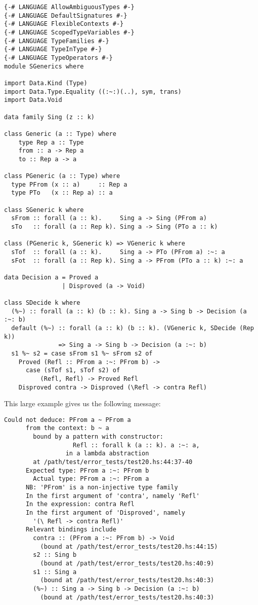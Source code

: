 \documentclass[a4paper]{article}
\begin{document}
\begin{lstlisting}[label={lst: T13.0}, numbers=none, caption={Example Program \cite{ex13}}]
{-# LANGUAGE AllowAmbiguousTypes #-}
{-# LANGUAGE DefaultSignatures #-}
{-# LANGUAGE FlexibleContexts #-}
{-# LANGUAGE ScopedTypeVariables #-}
{-# LANGUAGE TypeFamilies #-}
{-# LANGUAGE TypeInType #-}
{-# LANGUAGE TypeOperators #-}
module SGenerics where

import Data.Kind (Type)
import Data.Type.Equality ((:~:)(..), sym, trans)
import Data.Void

data family Sing (z :: k)

class Generic (a :: Type) where
    type Rep a :: Type
    from :: a -> Rep a
    to :: Rep a -> a

class PGeneric (a :: Type) where
  type PFrom (x :: a)     :: Rep a
  type PTo   (x :: Rep a) :: a

class SGeneric k where
  sFrom :: forall (a :: k).     Sing a -> Sing (PFrom a)
  sTo   :: forall (a :: Rep k). Sing a -> Sing (PTo a :: k)

class (PGeneric k, SGeneric k) => VGeneric k where
  sTof  :: forall (a :: k).     Sing a -> PTo (PFrom a) :~: a
  sFot  :: forall (a :: Rep k). Sing a -> PFrom (PTo a :: k) :~: a

data Decision a = Proved a
                | Disproved (a -> Void)

class SDecide k where
  (%~) :: forall (a :: k) (b :: k). Sing a -> Sing b -> Decision (a :~: b)
  default (%~) :: forall (a :: k) (b :: k). (VGeneric k, SDecide (Rep k))
               => Sing a -> Sing b -> Decision (a :~: b)
  s1 %~ s2 = case sFrom s1 %~ sFrom s2 of
    Proved (Refl :: PFrom a :~: PFrom b) ->
      case (sTof s1, sTof s2) of
          (Refl, Refl) -> Proved Refl
    Disproved contra -> Disproved (\Refl -> contra Refl)
\end{lstlisting}

This large example gives us the following message:

\begin{lstlisting}[label={lst: T13.0.2}, numbers=none, caption={Error}]
Could not deduce: PFrom a ~ PFrom a
      from the context: b ~ a
        bound by a pattern with constructor:
                   Refl :: forall k (a :: k). a :~: a,
                 in a lambda abstraction
        at /path/test/error_tests/test20.hs:44:37-40
      Expected type: PFrom a :~: PFrom b
        Actual type: PFrom a :~: PFrom a
      NB: 'PFrom' is a non-injective type family
      In the first argument of 'contra', namely 'Refl'
      In the expression: contra Refl
      In the first argument of 'Disproved', namely
        '(\ Refl -> contra Refl)'
      Relevant bindings include
        contra :: (PFrom a :~: PFrom b) -> Void
          (bound at /path/test/error_tests/test20.hs:44:15)
        s2 :: Sing b
          (bound at /path/test/error_tests/test20.hs:40:9)
        s1 :: Sing a
          (bound at /path/test/error_tests/test20.hs:40:3)
        (%~) :: Sing a -> Sing b -> Decision (a :~: b)
          (bound at /path/test/error_tests/test20.hs:40:3)
\end{lstlisting}
\end{document}
